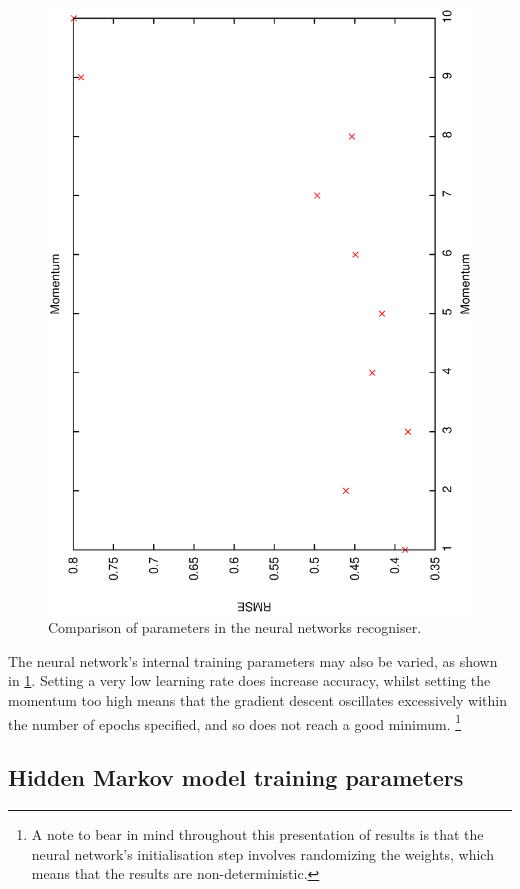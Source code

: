 \documentclass[12pt,a4,notitlepage]{report}
\renewcommand{\_}{\texttt{\symbol{95}}}
\newcommand{\<}{\texttt{\symbol{60}}}
\renewcommand{\>}{\texttt{\symbol{62}}}
\begin{document}
\begin{figure}
\includegraphics[scale=0.3,angle=-90]{results/neural_err/n_momentum.ps}
\caption{Comparison of parameters in the neural networks recogniser.}
\label{n_floatparameters}
\end{figure}

The neural network's internal training parameters may also be varied, as shown in \ref{n_floatparameters}. Setting a very low learning rate does increase accuracy, whilst setting the momentum too high means that the gradient descent oscillates excessively within the number of epochs specified, and so does not reach a good minimum. \footnote{A note to bear in mind throughout this presentation of results is that the neural network's initialisation step involves randomizing the weights, which means that the results are non-deterministic.}

\subsection{Hidden Markov model training parameters}
\end{document}
